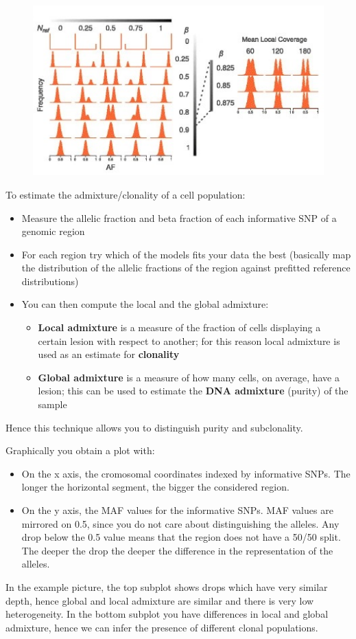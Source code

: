   \begin{figure}[H]
  \includegraphics{image_02.jpg}
  \end{figure}

  To estimate the admixture/clonality of a cell population:
  \begin{itemize}
    \item Measure the allelic fraction and beta fraction of each informative SNP of a genomic region
    \item For each region try which of the models fits your data the best (basically map the distribution of the allelic fractions of the region against prefitted reference distributions) 
    \item You can then compute the local and the global admixture:
    \begin{itemize}
      \item \textbf{Local admixture} is a measure of the fraction of cells displaying a certain lesion with respect to another; for this reason local admixture is used as an estimate for \textbf{clonality}
      \item \textbf{Global admixture} is a measure of how many cells, on average, have a lesion; this can be used to estimate the \textbf{DNA admixture} (purity) of the sample
    \end{itemize}
  \end{itemize}
  Hence this technique allows you to distinguish purity and subclonality.
  
  Graphically you obtain a plot with:
  \begin{itemize}
    \item On the x axis, the cromosomal coordinates indexed by informative SNPs. The longer the horizontal segment, the bigger the considered region. 
    \item On the y axis, the MAF values for the informative SNPs. MAF values are mirrored on 0.5, since you do not care about distinguishing the alleles. Any drop below the 0.5 value means that the region does not have a 50/50 split. The deeper the drop the deeper the difference in the representation of the alleles. 
  \end{itemize}
  In the example picture, the top subplot shows drops which have very similar depth, hence global and local admixture are similar and there is very low heterogeneity. In the bottom subplot you have differences in local and global admixture, hence we can infer the presence of different clonal populations. 

